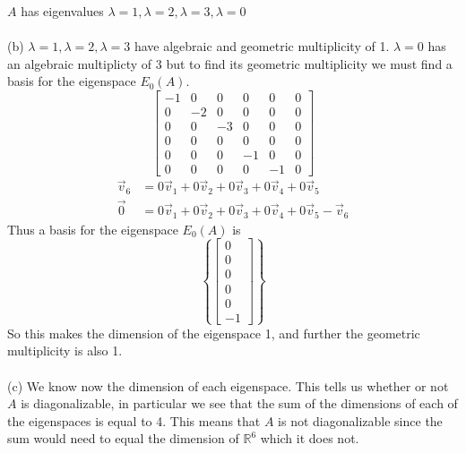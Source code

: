 \documentclass{report}
\begin{document}
$A$ has eigenvalues $\lambda=1,\lambda=2,\lambda=3,\lambda=0$\\
\\
\noindent (b) $\lambda=1, \lambda=2,\lambda=3$ have algebraic and geometric multiplicity of 1.  $\lambda=0$ has an algebraic multiplicty of 3 but to find its geometric multiplicity we must find a basis for the eigenspace $E_0(A)$.
$$
\begin{bmatrix}
-1& 0 & 0 & 0 & 0 & 0 \\
0 & -2 & 0 & 0 & 0 & 0 \\
0 & 0 & -3 & 0 & 0 & 0 \\
0 & 0 & 0 & 0 & 0 & 0 \\
0 & 0 & 0 & -1 & 0 & 0 \\
0 & 0 & 0 & 0 & -1 & 0
\end{bmatrix}
$$
$$
\begin{aligned}
\vec{v}_6 &= 0\vec{v}_1 + 0\vec{v}_2 + 0\vec{v}_3 + 0\vec{v}_4 + 0\vec{v}_5\\
\vec{0} &= 0\vec{v}_1 + 0\vec{v}_2 + 0\vec{v}_3 + 0\vec{v}_4 + 0\vec{v}_5 - \vec{v}_6
\end{aligned}
$$
Thus a basis for the eigenspace $E_0(A)$ is
$$
\left\{
\begin{bmatrix}0\\0\\0\\0\\0\\-1\end{bmatrix}
\right\}
$$
So this makes the dimension of the eigenspace 1,  and further the geometric multiplicity is also 1.  \\
\\
\noindent (c) We know now the dimension of each eigenspace.  This tells us whether or not $A$ is diagonalizable,  in particular we see that the sum of the dimensions of each of the eigenspaces is equal to 4.  This means that $A$ is not diagonalizable since the sum would need to equal the dimension of $\mathbb{R}^6$ which it does not.
\end{document}
